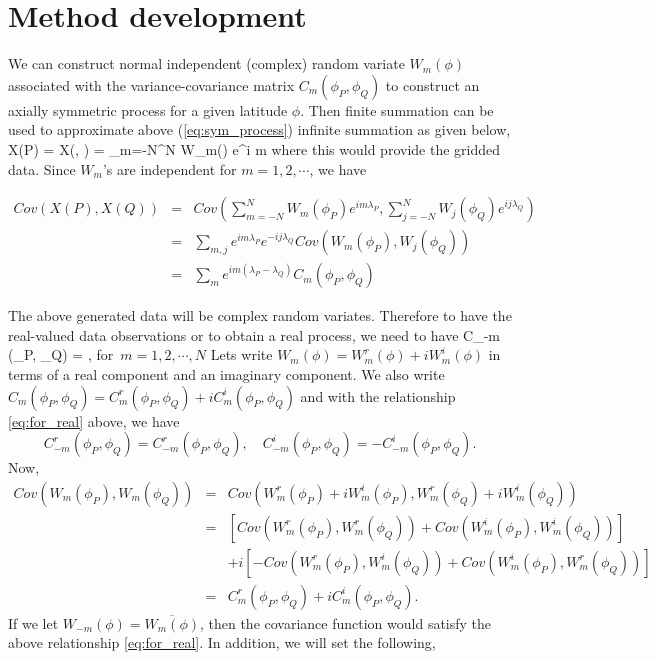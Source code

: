 		
		
	
	\section{Method development}
		
		
	We can construct normal independent (complex) random variate $W_m(\phi)$ associated with the variance-covariance matrix $C_m(\phi_P, \phi_Q)$ to construct an axially symmetric process for a given latitude $\phi$. Then finite summation can be used to approximate above (\ref{eq:sym_process}) infinite summation as given below,
	\beq
	X(P) = X(\phi, \lambda) = \sum_{m=-N}^{N} W_m(\phi) e^{i m \lambda}
	\eeq
	where this would provide  the gridded data.
	Since $W_m$'s are independent for $m = 1, 2, \cdots$, we have
		
	\begin{eqnarray*}
		Cov(X(P), {X(Q)}) &=& Cov\left(\sum_{m = -N}^{N} W_m(\phi_P) e^{i m \lambda_P}, \sum_{j=-N}^{N} {W_j(\phi_Q)} e^{i j \lambda_Q}\right) \\
		&=& \sum_{m, j} e^{i m \lambda_P} e^{-i j \lambda_Q} Cov(W_m(\phi_P), {W_j(\phi_Q)}) \\
		&=& \sum_{m} e^{im (\lambda_P - \lambda_Q)} C_m(\phi_P, \phi_Q)
	\end{eqnarray*}
		
	The above generated data will be complex random variates. Therefore to have the real-valued data observations or to obtain a real process, we need to have
	\beq \label{eq:for_real}
	C_{-m} (\phi_P, \phi_Q) = , \quad \mbox{for $m = 1, 2, \cdots, N$}
	\eeq
	Lets write $W_m(\phi) = W_{m}^{r}(\phi) + i W_{m}^i(\phi)$ in terms of a real component and an imaginary component. We also write $C_m(\phi_P, \phi_Q) = C_m^r(\phi_P, \phi_Q) + i C_m^i(\phi_P, \phi_Q)$
	and with the relationship \ref{eq:for_real} above, we have
	\[
		C_{-m}^r(\phi_P, \phi_Q) = C_{-m}^r(\phi_P, \phi_Q), \quad C_{-m}^i(\phi_P, \phi_Q) = - C_{-m}^i(\phi_P, \phi_Q).
	\]
	Now,
	\begin{eqnarray*}
		Cov(W_m(\phi_P), {W_m(\phi_Q)}) &=& Cov(W_m^r(\phi_P) + iW_m^i(\phi_P), W_m^r(\phi_Q) + i W_m^i(\phi_Q)) \\
		&=& \left[Cov(W_m^r(\phi_P), W_m^r(\phi_Q)) + Cov(W_m^i(\phi_P), W_m^i(\phi_Q))\right] \\
		& & + i\left[- Cov(W_m^r(\phi_P), W_m^i(\phi_Q)) + Cov(W_m^i(\phi_P), W_m^r(\phi_Q))\right] \\
		&=& C_m^r(\phi_P, \phi_Q) + i C_m^i(\phi_P, \phi_Q).
	\end{eqnarray*}
	If we let $W_{-m}(\phi) = \overline{W_m(\phi)}$, then the covariance function would satisfy the above relationship \ref{eq:for_real}. In addition, we will set the following,
		
